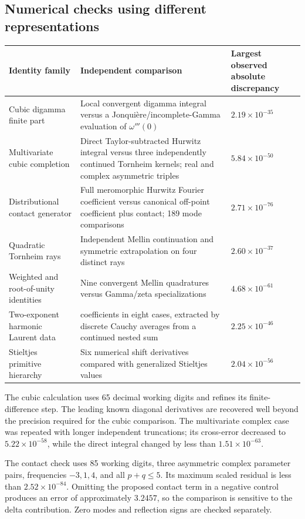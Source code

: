 \subsection{Numerical checks using different representations}

\begin{longtable}{@{}>{\raggedright\arraybackslash}p{}
 >{\raggedright\arraybackslash}p{}
 >{\raggedright\arraybackslash}p{}@{}}
\toprule
Identity family & Independent comparison & Largest observed
absolute discrepancy\\
\midrule
\endhead
Cubic digamma finite part &
Local convergent digamma integral versus a
Jonqui\`ere/incomplete-Gamma evaluation of $\omega'''(0)$ &
$2.19\times10^{-35}$\\[3pt]
Multivariate cubic completion &
Direct Taylor-subtracted Hurwitz integral versus three independently
continued Tornheim kernels; real and complex asymmetric triples &
$5.84\times10^{-50}$\\[3pt]
Distributional contact generator &
Full meromorphic Hurwitz Fourier coefficient versus canonical
off-point coefficient plus contact; 189 mode comparisons &
$2.71\times10^{-76}$\\[3pt]
Quadratic Tornheim rays &
Independent Mellin continuation and symmetric extrapolation on
four distinct rays &
$2.60\times10^{-37}$\\[3pt]
Weighted and root-of-unity identities &
Nine convergent Mellin quadratures versus Gamma/zeta
specializations &
$4.68\times10^{-61}$\\[3pt]
Two-exponent harmonic Laurent data &
21 coefficients in eight cases, extracted by discrete Cauchy
averages from a continued nested sum &
$2.25\times10^{-46}$\\[3pt]
Stieltjes primitive hierarchy &
Six numerical shift derivatives compared with generalized
Stieltjes values &
$2.04\times10^{-56}$\\
\bottomrule
\end{longtable}

The cubic calculation uses 65 decimal working digits and refines
its finite-difference step. The leading known diagonal derivatives
are recovered well beyond the precision required for the cubic
comparison. The multivariate complex case was repeated with longer
independent truncations; its cross-error decreased to
$5.22\times10^{-58}$, while the direct integral changed by less
than $1.51\times10^{-63}$.

The contact check uses 85 working digits, three asymmetric complex
parameter pairs, frequencies $-3,1,4$, and all $p+q\le5$.
Its maximum scaled residual is less than
$2.52\times10^{-84}$. Omitting the proposed contact term in a
negative control produces an error of approximately $3.2457$,
so the comparison is sensitive to the delta contribution.
Zero modes and reflection signs are checked separately.

